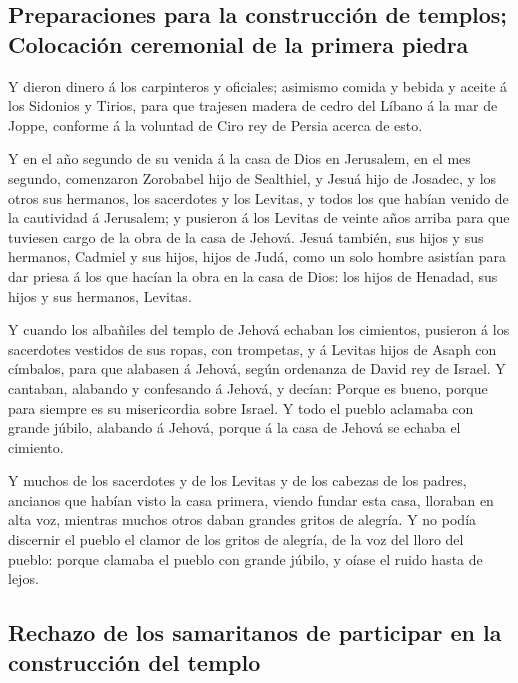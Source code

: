 \hypertarget{preparaciones-para-la-construcciuxf3n-de-templos-colocaciuxf3n-ceremonial-de-la-primera-piedra}{%
\subsection{Preparaciones para la construcción de templos; Colocación
ceremonial de la primera
piedra}\label{preparaciones-para-la-construcciuxf3n-de-templos-colocaciuxf3n-ceremonial-de-la-primera-piedra}}

 Y dieron dinero á los carpinteros y oficiales; asimismo
comida y bebida y aceite á los Sidonios y Tirios, para que trajesen
madera de cedro del Líbano á la mar de Joppe, conforme á la voluntad de
Ciro rey de Persia acerca de esto.

 Y en el año segundo de su venida á la casa de Dios en
Jerusalem, en el mes segundo, comenzaron Zorobabel hijo de Sealthiel, y
Jesuá hijo de Josadec, y los otros sus hermanos, los sacerdotes y los
Levitas, y todos los que habían venido de la cautividad á Jerusalem; y
pusieron á los Levitas de veinte años arriba para que tuviesen cargo de
la obra de la casa de Jehová.  Jesuá también, sus hijos y
sus hermanos, Cadmiel y sus hijos, hijos de Judá, como un solo hombre
asistían para dar priesa á los que hacían la obra en la casa de Dios:
los hijos de Henadad, sus hijos y sus hermanos, Levitas.

 Y cuando los albañiles del templo de Jehová echaban los
cimientos, pusieron á los sacerdotes vestidos de sus ropas, con
trompetas, y á Levitas hijos de Asaph con címbalos, para que alabasen á
Jehová, según ordenanza de David rey de Israel.  Y
cantaban, alabando y confesando á Jehová, y decían: Porque es bueno,
porque para siempre es su misericordia sobre Israel. Y todo el pueblo
aclamaba con grande júbilo, alabando á Jehová, porque á la casa de
Jehová se echaba el cimiento.

 Y muchos de los sacerdotes y de los Levitas y de los
cabezas de los padres, ancianos que habían visto la casa primera, viendo
fundar esta casa, lloraban en alta voz, mientras muchos otros daban
grandes gritos de alegría.  Y no podía discernir el pueblo
el clamor de los gritos de alegría, de la voz del lloro del pueblo:
porque clamaba el pueblo con grande júbilo, y oíase el ruido hasta de
lejos.

\hypertarget{rechazo-de-los-samaritanos-de-participar-en-la-construcciuxf3n-del-templo}{%
\subsection{Rechazo de los samaritanos de participar en la construcción
del
templo}\label{rechazo-de-los-samaritanos-de-participar-en-la-construcciuxf3n-del-templo}}


